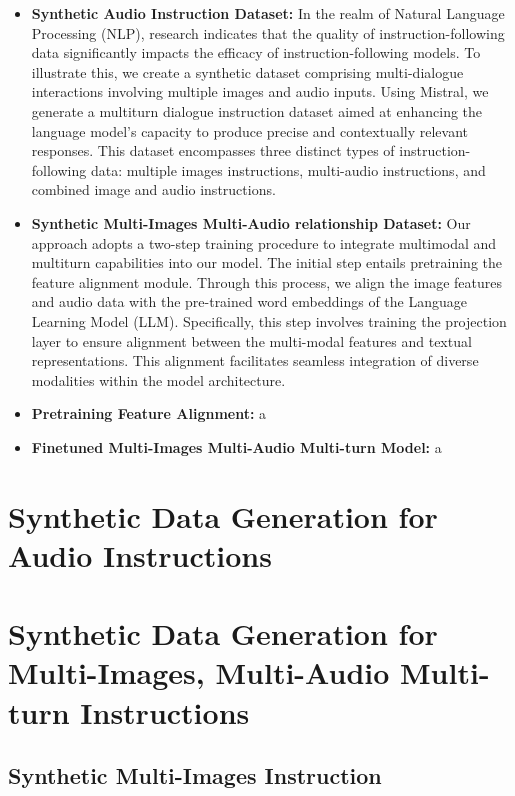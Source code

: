 \documentclass[preprint]{article}
\begin{document}
\begin{itemize}

  \item \textbf{Synthetic Audio Instruction Dataset:} In the realm of Natural Language Processing (NLP), research indicates that the quality of instruction-following data significantly impacts the efficacy of instruction-following models. To illustrate this, we create a synthetic dataset comprising multi-dialogue interactions involving multiple images and audio inputs. Using Mistral, we generate a multiturn dialogue instruction dataset aimed at enhancing the language model's capacity to produce precise and contextually relevant responses. This dataset encompasses three distinct types of instruction-following data: multiple images instructions,
        multi-audio instructions, and combined image and audio instructions.

  \item \textbf{Synthetic Multi-Images Multi-Audio relationship Dataset:} Our approach adopts a two-step training procedure to integrate multimodal and multiturn capabilities into our model. The initial step entails pretraining the feature alignment module. Through this process, we align the image features and audio data with the pre-trained word embeddings of the Language Learning Model (LLM). Specifically, this step involves training the projection layer to ensure alignment between the multi-modal features and textual representations. This alignment facilitates seamless integration of diverse modalities within the model architecture.

  \item \textbf{Pretraining Feature Alignment:} a

  \item \textbf{Finetuned Multi-Images Multi-Audio Multi-turn Model:} a

\end{itemize}

\section{Synthetic Data Generation for Audio Instructions}

\section{Synthetic Data Generation for Multi-Images, Multi-Audio Multi-turn Instructions}

\subsection{Synthetic Multi-Images Instruction}
\end{document}
